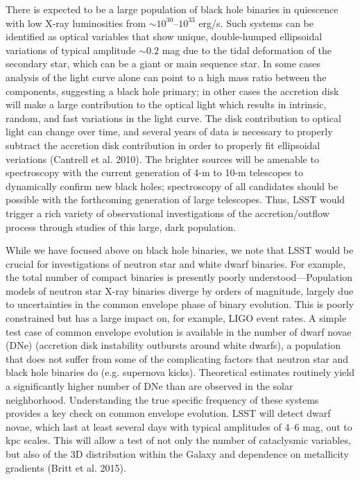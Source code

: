 There is expected to be a large population of black hole binaries in quiescence
with low X-ray luminosities from $\sim 10^{30}$--$10^{33}$ erg/s.
Such systems can be identified as optical variables that show unique,
double-humped ellipsoidal variations of typical amplitude $\sim 0.2$
mag due to the tidal deformation of the secondary star, which can be a
giant or main sequence star. In some cases analysis of the light curve
alone can point to a high mass ratio between the components,
suggesting a black hole primary; in other cases the accretion disk
will make a large contribution to the optical light which results in
intrinsic, random, and fast variations in the light curve. The disk
contribution to optical light can change over time, and several years
of data is necessary to properly subtract the accretion disk
contribution in order to properly fit ellipsoidal veriations (Cantrell
et al. 2010). The brighter sources will be amenable to spectroscopy
with the current generation of 4-m to 10-m telescopes to dynamically
confirm new black holes; spectroscopy of all candidates should be
possible with the forthcoming generation of large telescopes. Thus,
LSST would trigger a rich variety of observational investigations of
the accretion/outflow process through studies of this large, dark
population.

While we have focused above on black hole binaries, we note that LSST
would be crucial for investigations of neutron star and white dwarf
binaries. For example, the total number of compact binaries 
is presently
poorly understood---Population models of neutron star X-ray binaries diverge by orders 
of magnitude, largely due to uncertainties in the common envelope phase of binary evolution. This is
poorly constrained but has a large impact on, for example, LIGO event
rates. A simple test case of common envelope evolution is available in the number of dwarf novae (DNe) 
(accretion disk instability outbursts around white dwarfs), a population that does not suffer from
some of the complicating factors that neutron star and black hole binaries do (e.g. supernova kicks). 
Theoretical estimates routinely yield a significantly higher number of DNe than are observed in the solar
neighborhood. Understanding the true specific frequency of these
systems provides a key check on common envelope evolution.  LSST will detect dwarf novae, which last at least several days
with typical amplitudes of 4--6 mag,
out to kpc scales. This will allow a test of not only the number of
cataclysmic variables, but also of the 3D distribution within the
Galaxy and dependence on metallicity gradients (Britt et al. 2015).


